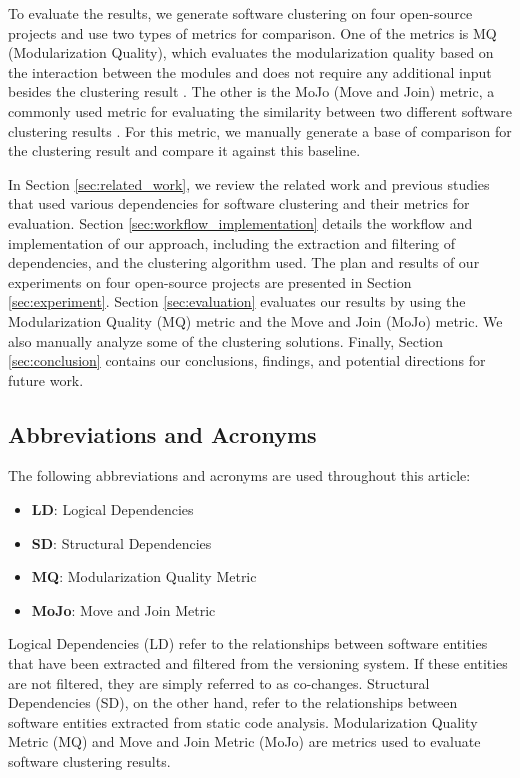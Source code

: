 \documentclass{ieeeaccess}
\begin{document}
To evaluate the results, we generate software clustering on four open-source projects and use two types of metrics for comparison. One of the metrics is MQ (Modularization Quality), which evaluates the modularization quality based on the interaction between the modules and does not require any additional input besides the clustering result \cite{b2}. The other is the MoJo (Move and Join) metric, a commonly used metric for evaluating the similarity between two different software clustering results \cite{b3}. For this metric, we manually generate a base of comparison for the clustering result and compare it against this baseline.

In Section \ref{sec:related_work}, we review the related work and previous studies that used various dependencies for software clustering and their metrics for evaluation.
Section \ref{sec:workflow_implementation} details the workflow and implementation of our approach, including the extraction and filtering of dependencies, and the clustering algorithm used.
The plan and results of our experiments on four open-source projects are presented in Section \ref{sec:experiment}. Section \ref{sec:evaluation} evaluates our results by using the Modularization Quality (MQ) metric and the Move and Join (MoJo) metric. We also manually analyze some of the clustering solutions.
Finally, Section \ref{sec:conclusion} contains our conclusions, findings, and potential directions for future work.

\subsection{Abbreviations and Acronyms}

The following abbreviations and acronyms are used throughout this article:

\begin{itemize}
    \item \textbf{LD}: Logical Dependencies
    \item \textbf{SD}: Structural Dependencies
    \item \textbf{MQ}: Modularization Quality Metric
    \item \textbf{MoJo}: Move and Join Metric
\end{itemize}


Logical Dependencies (LD) refer to the relationships between software entities that have been extracted and filtered from the versioning system. If these entities are not filtered, they are simply referred to as co-changes. 
Structural Dependencies (SD), on the other hand, refer to the relationships between software entities extracted from static code analysis.
Modularization Quality Metric (MQ) and Move and Join Metric (MoJo) are metrics used to evaluate software clustering results.
\end{document}
